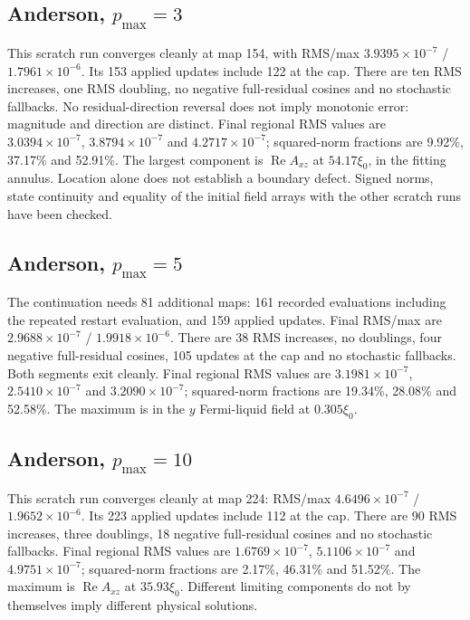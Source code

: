 \documentclass[11pt,a4paper]{article}
\begin{document}
\clearpage
\subsection{Anderson, $p_{\max}=3$}
This scratch run converges cleanly at map 154, with RMS/max
$3.9395\times10^{-7}$ / $1.7961\times10^{-6}$. Its 153 applied updates include
122 at the cap. There are ten RMS increases, one RMS doubling, no negative
full-residual cosines and no stochastic fallbacks. No residual-direction
reversal does not imply monotonic error: magnitude and direction are distinct.
Final regional RMS values are $3.0394\times10^{-7}$, $3.8794\times10^{-7}$
and $4.2717\times10^{-7}$; squared-norm fractions are 9.92\%, 37.17\% and
52.91\%. The largest component is $\operatorname{Re}A_{xz}$ at
$54.17\xi_0$, in the fitting annulus. Location alone does not establish a
boundary defect. Signed norms, state continuity and equality of the initial
field arrays with the other scratch runs have been checked.

\subsection{Anderson, $p_{\max}=5$}
The continuation needs 81 additional maps: 161 recorded evaluations including
the repeated restart evaluation, and 159 applied updates. Final RMS/max are
$2.9688\times10^{-7}$ / $1.9918\times10^{-6}$. There are 38 RMS increases,
no doublings, four negative full-residual cosines, 105 updates at the cap
and no stochastic fallbacks. Both segments exit cleanly. Final regional RMS
values are $3.1981\times10^{-7}$, $2.5410\times10^{-7}$ and
$3.2090\times10^{-7}$; squared-norm fractions are 19.34\%, 28.08\% and
52.58\%. The maximum is in the $y$ Fermi-liquid field at $0.305\xi_0$.

\subsection{Anderson, $p_{\max}=10$}
This scratch run converges cleanly at map 224: RMS/max
$4.6496\times10^{-7}$ / $1.9652\times10^{-6}$. Its 223 applied updates include
112 at the cap. There are 90 RMS increases, three doublings, 18 negative
full-residual cosines and no stochastic fallbacks. Final regional RMS values
are $1.6769\times10^{-7}$, $5.1106\times10^{-7}$ and $4.9751\times10^{-7}$;
squared-norm fractions are 2.17\%, 46.31\% and 51.52\%. The maximum is
$\operatorname{Re}A_{xz}$ at $35.93\xi_0$. Different limiting components
do not by themselves imply different physical solutions.
\end{document}
